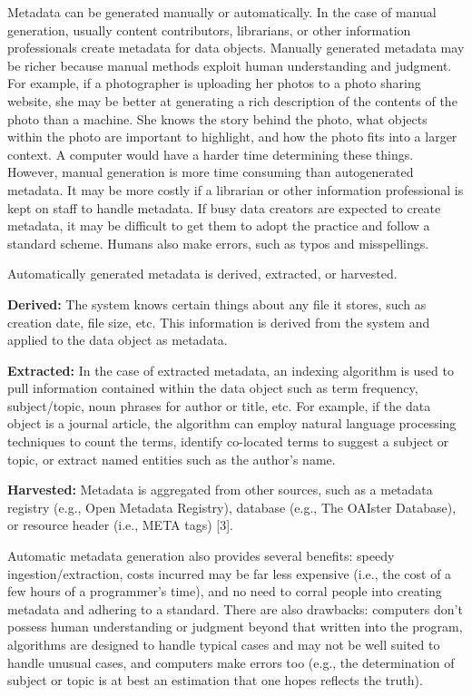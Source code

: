 \documentclass[10pt,oneside]{memoir}
\begin{document}
Metadata can be generated manually or automatically. In the case of manual generation, usually content contributors, librarians, or other information professionals create metadata for data objects. Manually generated metadata may be richer because manual methods exploit human understanding and judgment. For example, if a photographer is uploading her photos to a photo sharing website, she may be better at generating a rich description of the contents of the photo than a machine. She knows the story behind the photo, what objects within the photo are important to highlight, and how the photo fits into a larger context. A computer would have a harder time determining these things. However, manual generation is more time consuming than autogenerated metadata. It may be more costly if a librarian or other information professional is kept on staff to handle metadata. If busy data creators are expected to create metadata, it may be difficult to get them to adopt the practice and follow a standard scheme. Humans also make errors, such as typos and misspellings.

Automatically generated metadata is derived, extracted, or harvested.

\textbf{Derived:} The system knows certain things about any file it stores, such as creation date, file size, etc. This information is derived from the system and applied to the data object as metadata.

\textbf{Extracted:} In the case of extracted metadata, an indexing algorithm is used to pull information contained within the data object such as term frequency, subject/topic, noun phrases for author or title, etc. For example, if the data object is a journal article, the algorithm can employ natural language processing techniques to count the terms, identify co-located terms to suggest a subject or topic, or extract named entities such as the author's name.

\textbf{Harvested:} Metadata is aggregated from other sources, such as a metadata registry (e.g., Open Metadata Registry), database (e.g., The OAIster Database), or resource header (i.e., META tags) [3].

Automatic metadata generation also provides several benefits: speedy ingestion/extraction, costs incurred may be far less expensive (i.e., the cost of a few hours of a programmer's time), and no need to corral people into creating metadata and adhering to a standard. There are also drawbacks: computers don't possess human understanding or judgment beyond that written into the program, algorithms are designed to handle typical cases and may not be well suited to handle unusual cases, and computers make errors too (e.g., the determination of subject or topic is at best an estimation that one hopes reflects the truth).
\end{document}
